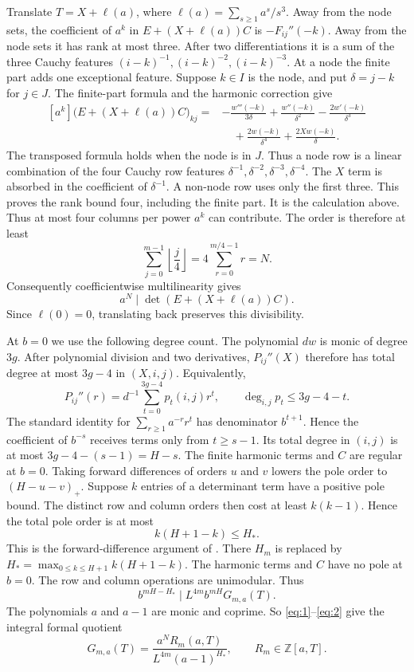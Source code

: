 Translate $T=X+\ell(a)$, where
$\ell(a)=\sum_{s\ge1}a^s/s^3$. Away from the node sets, the coefficient of
$a^k$ in $E+(X+\ell(a))C$ is $-F_{ij}''(-k)$. Away from the node sets it
has rank at most three. After two differentiations it is a sum of the
three Cauchy features $(i-k)^{-1},(i-k)^{-2},(i-k)^{-3}$. At a node the
finite part adds one exceptional feature. Suppose
$k\in I$ is the node, and put $\delta=j-k$ for $j\in J$. The
finite-part formula and the harmonic correction give
\begin{equation}
\begin{aligned}
 [a^k]\bigl(E+(X+\ell(a))C\bigr)_{k j}
  ={}\!&-\frac{w'''(-k)}{3\delta}+\frac{w''(-k)}{\delta^2}
      -\frac{2w'(-k)}{\delta^3}\\
 &\quad+\frac{2w(-k)}{\delta^4}
      +\frac{2Xw(-k)}{\delta}.
\end{aligned}
\label{eq:node-coefficient}
\end{equation}
The transposed formula holds when the node is in $J$. Thus a node row is a
linear combination of the four Cauchy row features
$\delta^{-1},\delta^{-2},\delta^{-3},\delta^{-4}$. The $X$ term is absorbed
in the coefficient of $\delta^{-1}$. A non-node row uses only the first
three. This proves the rank bound four, including the finite part. It is the
calculation above. Thus at most four columns per power
$a^k$ can contribute.
The order is therefore at least
\[
 \sum_{j=0}^{m-1}\left\lfloor\frac j4\right\rfloor
 =4\sum_{r=0}^{m/4-1}r=N.
\]
Consequently coefficientwise multilinearity gives
\[
 a^N\mid\det(E+(X+\ell(a))C).
\]
Since $\ell(0)=0$, translating back preserves this divisibility.

At $b=0$ we use the following degree count. The polynomial $dw$ is monic of
degree $3g$. After polynomial division and two derivatives, $P_{ij}''(X)$
therefore has total degree at most $3g-4$ in $(X,i,j)$. Equivalently,
\[
 P_{ij}''(r)=d^{-1}\sum_{t=0}^{3g-4}p_t(i,j)r^t,
 \qquad \deg_{i,j}p_t\le 3g-4-t.
\]
The standard identity for $\sum_{r\ge1}a^{-r}r^t$ has denominator
$b^{t+1}$. Hence the coefficient of $b^{-s}$ receives terms only from
$t\ge s-1$. Its total degree in $(i,j)$ is at most
$3g-4-(s-1)=H-s$. The finite harmonic terms and $C$ are regular at
$b=0$. Taking forward differences of orders $u$ and $v$ lowers the pole
order to $(H-u-v)_+$. Suppose $k$ entries of a determinant term have
a positive pole bound. The distinct row and column orders then cost at
least $k(k-1)$. Hence the total pole order is at most
\[
 k(H+1-k)\le H_*.
\]
This is the forward-difference argument of \cite[Lemma~4.8]{ZhB}. There $H_m$ is
replaced by
$H_* =\max_{0\le k\le H+1}k(H+1-k)$. The harmonic terms and $C$ have no
pole at $b=0$. The row and column operations are unimodular. Thus
\begin{equation}
 b^{mH-H_*}\mid L^{4m}b^{mH}G_{m,a}(T).                   \label{eq:2}
\end{equation}
The polynomials $a$ and $a-1$ are monic and coprime. So
\eqref{eq:1}--\eqref{eq:2} give the integral formal quotient
\[
G_{m,a}(T)=\frac{a^N R_m(a,T)}{L^{4m}(a-1)^{H_*}},
\qquad R_m\in\mathbb Z[a,T].
\]

